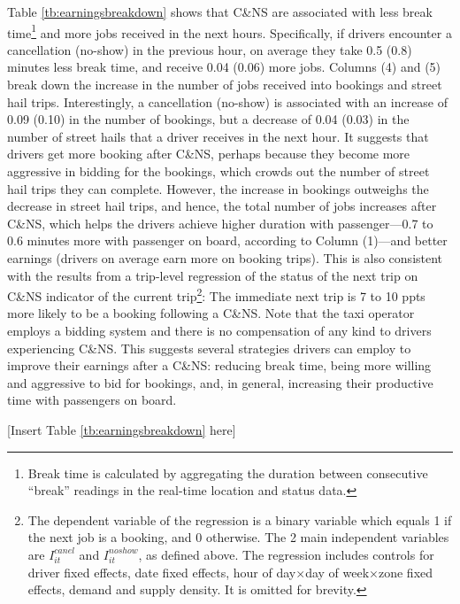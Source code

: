 \documentclass[reviewmode]{restat}
\begin{document}
Table \ref{tb:earningsbreakdown} shows that C\&NS are associated with less break time\footnote{Break time
is calculated by aggregating the duration between consecutive ``break'' readings in the real-time location
and status data.} and more jobs received in the next hours. Specifically, if drivers encounter a cancellation (no-show) in the previous hour, 
on average they take 0.5 (0.8) minutes less break time, and receive 0.04 
(0.06) more jobs. Columns (4) and (5) break down the increase in the number of jobs received into bookings and
street hail trips. Interestingly, a cancellation (no-show) is associated with an increase of 0.09 (0.10) in the
number of bookings, but a decrease of 0.04 (0.03) in the number of street hails that a driver receives in the
next hour. It suggests that drivers get more booking after C\&NS, perhaps because they become more aggressive
in bidding for the bookings, which crowds out the number of street hail trips they can complete. 
However, the increase in bookings outweighs the decrease in street hail trips, and hence, the total number
of jobs increases after C\&NS, which helps the drivers achieve higher duration with passenger---0.7 to 0.6
minutes more with passenger on board, according to Column (1)---and better earnings (drivers on average 
earn more on booking trips). This is also consistent with the results from a trip-level regression of the 
status of the next trip on C\&NS indicator of the current trip\footnote{The dependent variable of the 
regression is a binary variable which equals 1 if the next job is a booking, and 0 otherwise. 
The 2 main independent variables are $I_{it}^{canel}$ and $I_{it}^{noshow}$, as defined above.
The regression includes controls for driver fixed effects, date fixed effects, hour of day\(\times\)day 
of week\(\times\)zone fixed effects, demand and supply density. It is omitted for brevity.}: The immediate 
next trip is 7 to 10 ppts more likely to be a booking following a C\&NS. Note that the taxi operator employs 
a bidding system and there is no compensation of any kind to drivers experiencing C\&NS. 
This suggests several strategies drivers can employ to improve their earnings after a C\&NS: reducing
break time, being more willing and aggressive to bid for bookings, and, in general, increasing their 
productive time with passengers on board.

\begin{center}
	[Insert Table \ref{tb:earningsbreakdown} here]
\end{center}
\end{document}

